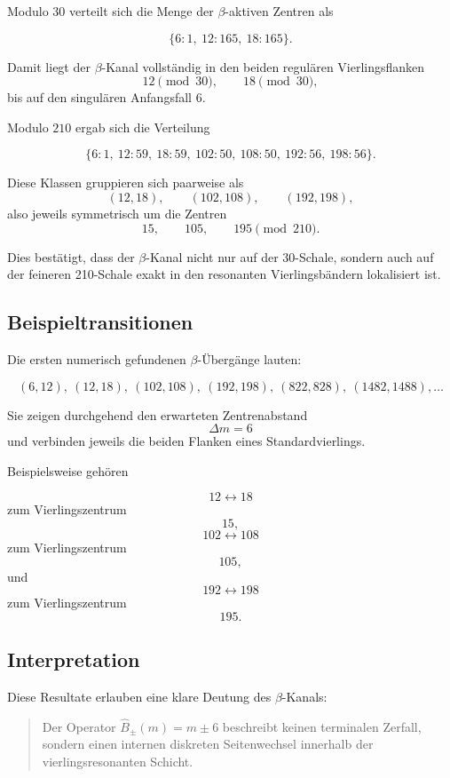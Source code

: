 \documentclass[11pt,a4paper]{article}
\theoremstyle{definition}
\theoremstyle{plain}
\theoremstyle{remark}
\begin{document}
	Modulo \(30\) verteilt sich die Menge der \(\beta\)-aktiven Zentren als
	
	\[
	\{6:1,\ 12:165,\ 18:165\}.
	\]
	
	Damit liegt der \(\beta\)-Kanal vollständig in den beiden regulären Vierlingsflanken
	\[
	12 \pmod{30},
	\qquad
	18 \pmod{30},
	\]
	bis auf den singulären Anfangsfall \(6\).
	
	Modulo \(210\) ergab sich die Verteilung
	
	\[
	\{6:1,\ 12:59,\ 18:59,\ 102:50,\ 108:50,\ 192:56,\ 198:56\}.
	\]
	
	Diese Klassen gruppieren sich paarweise als
	\[
	(12,18),\qquad (102,108),\qquad (192,198),
	\]
	also jeweils symmetrisch um die Zentren
	\[
	15,\qquad 105,\qquad 195 \pmod{210}.
	\]
	
	Dies bestätigt, dass der \(\beta\)-Kanal nicht nur auf der 30-Schale, sondern auch auf der feineren 210-Schale exakt in den resonanten Vierlingsbändern lokalisiert ist.
	
	\subsection{Beispieltransitionen}
	
	Die ersten numerisch gefundenen \(\beta\)-Übergänge lauten:
	
	\[
	(6,12),\ (12,18),\ (102,108),\ (192,198),\ (822,828),\ (1482,1488),\dots
	\]
	
	Sie zeigen durchgehend den erwarteten Zentrenabstand
	\[
	\Delta m = 6
	\]
	und verbinden jeweils die beiden Flanken eines Standardvierlings.
	
	Beispielsweise gehören
	
	\[
	12\longleftrightarrow 18
	\]
	zum Vierlingszentrum
	\[
	15,
	\]
	\[
	102\longleftrightarrow 108
	\]
	zum Vierlingszentrum
	\[
	105,
	\]
	und
	\[
	192\longleftrightarrow 198
	\]
	zum Vierlingszentrum
	\[
	195.
	\]
	
	\subsection{Interpretation}
	
	Diese Resultate erlauben eine klare Deutung des \(\beta\)-Kanals:
	
	\begin{quote}
		Der Operator \(\hat B_\pm(m)=m\pm 6\) beschreibt keinen terminalen Zerfall, sondern einen internen diskreten Seitenwechsel innerhalb der vierlingsresonanten Schicht.
	\end{quote}
	
\end{document}
